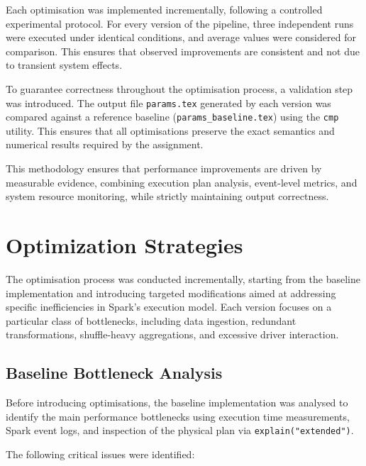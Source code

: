 \documentclass[conference,a4paper]{IEEEtran}
\begin{document}
Each optimisation was implemented incrementally, following a controlled
experimental protocol. For every version of the pipeline, three independent runs
were executed under identical conditions, and average values were considered for
comparison. This ensures that observed improvements are consistent and not due
to transient system effects.

To guarantee correctness throughout the optimisation process, a validation step
was introduced. The output file \texttt{params.tex} generated by each version was
compared against a reference baseline (\texttt{params\_baseline.tex}) using the
\texttt{cmp} utility. This ensures that all optimisations preserve the exact
semantics and numerical results required by the assignment.

This methodology ensures that performance improvements are driven by measurable
evidence, combining execution plan analysis, event-level metrics, and system
resource monitoring, while strictly maintaining output correctness.

\section{Optimization Strategies}
\label{sec:optimizations}

The optimisation process was conducted incrementally, starting from the
baseline implementation and introducing targeted modifications aimed at
addressing specific inefficiencies in Spark’s execution model. Each version
focuses on a particular class of bottlenecks, including data ingestion,
redundant transformations, shuffle-heavy aggregations, and excessive
driver interaction.

\subsection{Baseline Bottleneck Analysis}
\label{sec:baseline_bottleneck_analysis}

Before introducing optimisations, the baseline implementation was analysed to
identify the main performance bottlenecks using execution time measurements,
Spark event logs, and inspection of the physical plan via
\texttt{explain("extended")}.

The following critical issues were identified:
\end{document}
